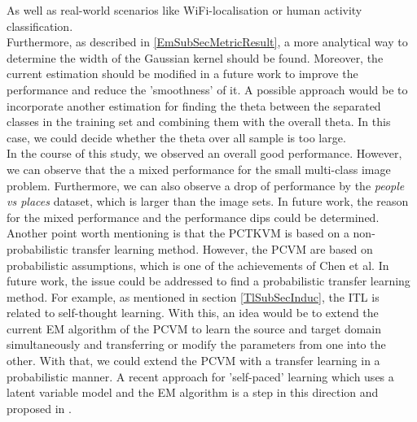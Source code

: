 As well as real-world scenarios like WiFi-localisation or human activity classification.\cite[p. 32]{Weiss.2016}\\
Furthermore, as described in \ref{EmSubSecMetricResult}, a more analytical way to determine the width of the Gaussian kernel should be found. Moreover, the current estimation should be modified in a future work to improve the performance and reduce the 'smoothness' of it.
A possible approach would be to incorporate another estimation for finding the theta between the separated classes in the training set and combining them with the overall theta. In this case, we could decide whether the theta over all sample is too large.\\
In the course of this study, we observed an overall good performance. However, we can observe that the a mixed performance for the small multi-class image problem. Furthermore, we can also observe a drop of performance by the \textit{people vs places} dataset, which is larger than the image sets.
In future work, the reason for the mixed performance and the performance dips could be determined.\\
Another point worth mentioning is that the \acs{PCTKVM} is based on a non-probabilistic transfer learning method. 
However, the \acs{PCVM} are based on probabilistic assumptions, which is one of the achievements of Chen et al.
In future work, the issue could be addressed to find a probabilistic transfer learning method.
For example, as mentioned in section \ref{TlSubSecInduc}, the \acl{ITL} is related to self-thought learning.
With this, an idea would be to extend the current \acs{EM} algorithm of the \acs{PCVM} to learn the source and target domain simultaneously and transferring or modify the parameters from one into the other.
With that, we could extend the \acs{PCVM} with a transfer learning in a probabilistic manner.
A recent approach for 'self-paced' learning which uses a latent variable model and the \acs{EM} algorithm is a step in this direction and proposed in \cite{Kumar.2010}.

